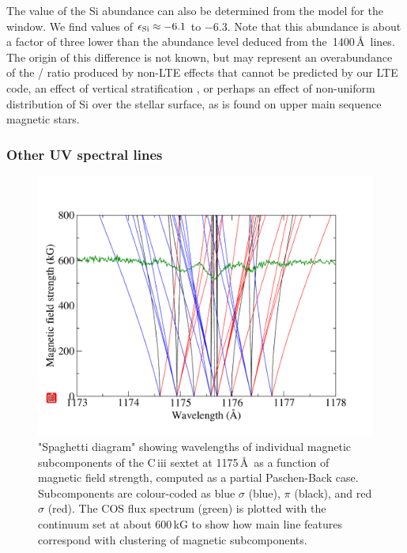 \documentclass[fleqn,usenatbib]{mnras}
\begin{document}

The value of the Si abundance  can also be determined from the model for the  window.  We find values of $\epsilon_{\rm Si} \approx -6.1$ to $-6.3$. Note that this abundance is about a factor of three lower than the abundance level deduced from the \,1400\,\AA\ lines. The origin of this difference is not known, but may represent an overabundance of the / ratio produced by non-LTE effects that cannot be predicted by our LTE code, an effect of vertical stratification \citep{koesteretal14-1}, or perhaps an effect of non-uniform distribution of Si over the stellar surface, as is found on upper main sequence magnetic stars.

\subsubsection{Other UV spectral lines}


\begin{figure}
    \centering
    \includegraphics[width=9 cm]{ciii_ppe_obs.pdf}
    \caption{"Spaghetti diagram" showing wavelengths of individual magnetic subcomponents of the C\,{\sc iii} sextet at 1175\,\AA\ as a function of magnetic field strength, computed as a partial Paschen-Back case. Subcomponents are colour-coded as blue $\sigma$ (blue), $\pi$ (black), and red $\sigma$ (red). The COS flux spectrum (green) is plotted with the continuum set at about 600\,kG to show how main line features correspond with clustering of magnetic subcomponents.}
    \label{fig:ciii_ppe_obs}
\end{figure}
\end{document}
